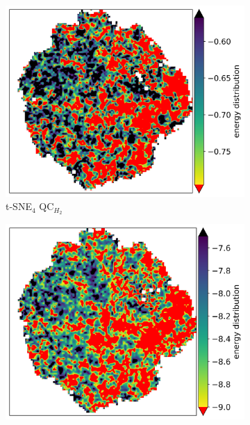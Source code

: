 \documentclass{article} %
\begin{document}
\begin{figure}[ht]
    \begin{subfigure}{0.23\textwidth}
        \centering
        \includegraphics[width=\textwidth]{images/tsqe/vqe-model-circuits_4_qubits_quantum_arch2vec_full_embedding_full_embedding_smooth.png}
        \caption{t-SNE$_4$ QC$_{H_2}$}
        \label{fig:t-SNE-4}
    \end{subfigure}
    \begin{subfigure}{0.23\textwidth}
        \centering
        \includegraphics[width=\textwidth]{images/tsqe/maxcut-model-circuits_4_qubits_quantum_arch2vec_full_embedding_full_embedding_smooth.png}

\end{subfigure}
\end{figure}
\end{document}
